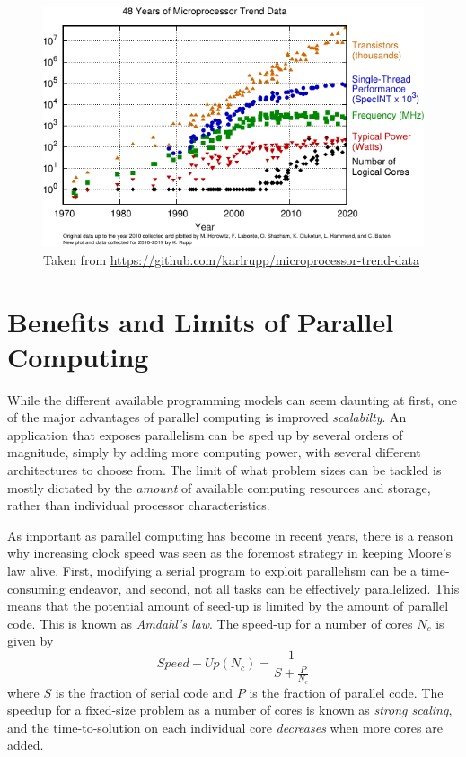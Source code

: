 \begin{figure}
\centering
\includegraphics[scale=1.2]{Pics/moore}
\caption{Taken from \protect\url{https://github.com/karlrupp/microprocessor-trend-data}}
\label{fig:MOORE}
\end{figure}

\section{Benefits and Limits of Parallel Computing}

While the different available programming models can seem daunting at first, one of the major advantages of parallel computing is improved \emph{scalabilty}. An application that exposes parallelism can be sped up by several orders of magnitude, simply by adding more computing power, with several different architectures to choose from. The limit of what problem sizes can be tackled is mostly dictated by the \emph{amount} of available computing resources and storage, rather than individual processor characteristics.

As important as parallel computing has become in recent years, there is a reason why increasing clock speed was seen as the foremost strategy in keeping Moore's law alive. First, modifying a serial program to exploit parallelism can be a time-consuming endeavor, and second, not all tasks can be effectively parallelized. This means that the potential amount of seed-up is limited by the amount of parallel code. This is known as \emph{Amdahl's law}. The speed-up for a number of cores $N_c$ is given by
\begin{equation}
Speed-Up(N_c) = \frac{1}{S + \frac{P}{N_c}}
\end{equation}
\noindent where $S$ is the fraction of serial code and $P$ is the fraction of parallel code. The speedup for a fixed-size problem as a number of cores is known as \emph{strong scaling}, and the time-to-solution on each individual core \emph{decreases} when more cores are added.

